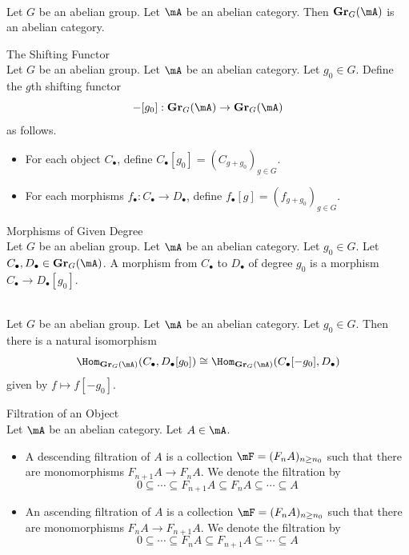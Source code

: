 \documentclass[a4paper]{article}
\begin{document}
\begin{lmm}{}{}\\
Let $G$ be an abelian group. Let $\mA$ be an abelian category. Then $\bold{Gr}_G(\mA)$ is an abelian category. 
\end{lmm}

\begin{defn}{The Shifting Functor}{}\\
Let $G$ be an abelian group. Let $\mA$ be an abelian category. Let $g_0\in G$. Define the $g$th shifting functor $$-[g_0]:\bold{Gr}_G(\mA)\to\bold{Gr}_G(\mA)$$ as follows. 
\begin{itemize}
\item For each object $C_\bullet$, define $C_\bullet[g_0]=(C_{g+g_0})_{g\in G}$. 
\item For each morphisms $f_\bullet:C_\bullet\to D_\bullet$, define $f_\bullet[g]=(f_{g+g_0})_{g\in G}$. 
\end{itemize}
\end{defn}

\begin{defn}{Morphisms of Given Degree}{}\\
Let $G$ be an abelian group. Let $\mA$ be an abelian category. Let $g_0\in G$. Let $C_\bullet,D_\bullet\in\bold{Gr}_G(\mA)$. A morphism from $C_\bullet$ to $D_\bullet$ of degree $g_0$ is a morphism $C_\bullet\to D_\bullet[g_0]$. 
\end{defn}

\begin{lmm}{}{}\\
Let $G$ be an abelian group. Let $\mA$ be an abelian category. Let $g_0\in G$. Then there is a natural isomorphism $$\Hom_{\bold{Gr}_G(\mA)}(C_\bullet,D_\bullet[g_0])\cong\Hom_{\bold{Gr}_G(\mA)}(C_\bullet[-g_0],D_\bullet)$$ given by $f\mapsto f[-g_0]$. 
\end{lmm}

\begin{defn}{Filtration of an Object}{}\\
Let $\mA$ be an abelian category. Let $A\in\mA$. 
\begin{itemize}
\item A descending filtration of $A$ is a collection $\mF=(F_nA)_{n\geq n_0}$ such that there are monomorphisms $F_{n+1}A\to F_nA$. We denote the filtration by $$0\subseteq\cdots\subseteq F_{n+1}A\subseteq F_nA\subseteq\cdots\subseteq A$$
\item An ascending filtration of $A$ is a collection $\mF=(F_nA)_{n\geq n_0}$ such that there are monomorphisms $F_nA\to F_{n+1}A$. We denote the filtration by $$0\subseteq\cdots\subseteq F_nA\subseteq F_{n+1}A\subseteq\cdots\subseteq A$$
\end{itemize}
\end{defn}
\end{document}

